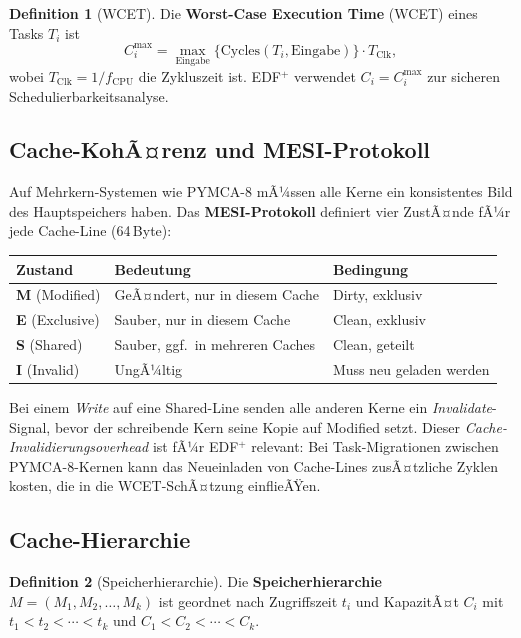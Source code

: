 ﻿\documentclass[a4paper,12pt]{scrreprt}
\theoremstyle{definition}
\newtheorem{definition}{Definition}[chapter]
\begin{document}
	\begin{definition}[WCET]
		Die \textbf{Worst-Case Execution Time} (WCET) eines Tasks $T_i$ ist
		\[
		C_i^{\max} = \max_{\text{Eingabe}} \bigl\{\text{Cycles}(T_i, \text{Eingabe})\bigr\}
		\cdot T_{\text{Clk}},
		\]
		wobei $T_{\text{Clk}} = 1/f_{\text{CPU}}$ die Zykluszeit ist. EDF$^+$
		verwendet $C_i = C_i^{\max}$ zur sicheren Schedulierbarkeitsanalyse.
	\end{definition}

	\subsection{Cache-KohÃ¤renz und MESI-Protokoll}

	Auf Mehr\-kern-Systemen wie PYMCA-8 mÃ¼ssen alle Kerne ein konsistentes Bild
	des Hauptspeichers haben. Das \textbf{MESI-Protokoll} definiert vier
	ZustÃ¤nde fÃ¼r jede Cache-Line (64\,Byte):

	\begin{center}
		\begin{tabular}{lll}
			\toprule
			Zustand & Bedeutung & Bedingung \\
			\midrule
			\textbf{M} (Modified)  & GeÃ¤ndert, nur in diesem Cache & Dirty, exklusiv \\
			\textbf{E} (Exclusive) & Sauber, nur in diesem Cache    & Clean, exklusiv \\
			\textbf{S} (Shared)    & Sauber, ggf.\ in mehreren Caches & Clean, geteilt \\
			\textbf{I} (Invalid)   & UngÃ¼ltig                        & Muss neu geladen werden \\
			\bottomrule
		\end{tabular}
	\end{center}

	Bei einem \emph{Write} auf eine Shared-Line senden alle anderen Kerne ein
	\emph{Invalidate}-Signal, bevor der schreibende Kern seine Kopie auf Modified
	setzt. Dieser \emph{Cache-Invalidierungsoverhead} ist fÃ¼r EDF$^+$ relevant:
	Bei Task-Migrationen zwischen PYMCA-8-Kernen kann das Neueinladen von
	Cache-Lines zusÃ¤tzliche Zyklen kosten, die in die WCET-SchÃ¤tzung einflieÃŸen.

	\subsection{Cache-Hierarchie}

	\begin{definition}[Speicherhierarchie]
		Die \textbf{Speicherhierarchie} $M = (M_1, M_2, \ldots, M_k)$ ist geordnet
		nach Zugriffszeit $t_i$ und KapazitÃ¤t $C_i$ mit $t_1 < t_2 < \cdots < t_k$
		und $C_1 < C_2 < \cdots < C_k$.
	\end{definition}
	
\end{document}
